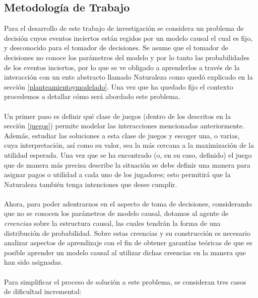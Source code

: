 \documentclass[11pt]{article}
\theoremstyle{plain}
\begin{document}
\subsection{Metodología de Trabajo}
Para el desarrollo de este trabajo de investigación se considera un problema de decisión cuyos eventos inciertos están regidos por un modelo causal el cual es fijo, y desconocido para el tomador de decisiones. Se asume que el tomador de decisiones no conoce los parámetros del modelo y por lo tanto las probabilidades de los eventos inciertos, por lo que se ve obligado a aprenderlos a través de la interacción con un ente abstracto llamado Naturaleza como quedó explicado en la sección \ref{planteamientoymodelado}. Una vez que ha quedado fijo el contexto procedemos a detallar cómo será abordado este problema.\\
\\
\indent Un primer paso es definir qué clase de juegos (dentro de los descritos en la sección \ref{juegos}) permite modelar las interacciones mencionadas anteriormente. Además, estudiar las soluciones a esta clase de juegos y escoger una, o varias, cuya interpretación, así como su valor, sea la más cercana a la maximización de la utilidad esperada. Una vez que se ha encontrado (o, en su caso, definido) el juego que de manera más precisa describe la situación se debe definir una manera para asignar pagos o utilidad a cada uno de los jugadores; esto permitirá que la Naturaleza también tenga intenciones que desee cumplir.\\
\\
\indent Ahora, para poder adentrarnos en el aspecto de toma de decisiones, considerando que no se conocen los parámetros de modelo causal, dotamos al agente de \textit{creencias} sobre la estructura causal, las cuales tendrán la forma de una distribución de probabilidad. Sobre estas creencias y su construcción es necesario analizar aspectos de aprendizaje con el fin de obtener garantías teóricas de que es posible aprender un modelo causal al utilizar dichas creencias en la manera que han sido asignadas.\\
\\
Para simplificar el proceso de solución a este problema, se consideran tres casos de dificultad incremental:
\end{document}
